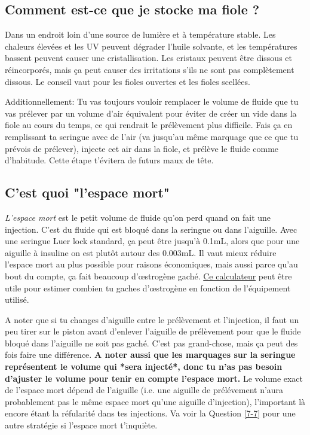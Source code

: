 \documentclass{article}
\begin{document}
\subsection{Comment est-ce que je stocke ma fiole ?}\label{5-25}

Dans un endroit loin d'une source de lumière et à température stable. Les chaleurs élevées et les UV peuvent dégrader l'huile solvante, et les températures bassent peuvent causer une cristallisation. Les cristaux peuvent être dissous et réincorporés, mais ça peut causer des irritations s'ils ne sont pas complètement dissous. Le conseil vaut pour les fioles ouvertes et les fioles scellées.

Additionnellement: Tu vas toujours vouloir remplacer le volume de fluide que tu vas prélever par un volume d'air équivalent pour éviter de créer un vide dans la fiole au cours du temps, ce qui rendrait le prélèvement plus difficile. Fais ça en remplissant ta seringue avec de l'air (va jusqu'au même marquage que ce que tu prévois de prélever), injecte cet air dans la fiole, et prélève le fluide comme d'habitude. Cette étape t'évitera de futurs maux de tête.

\subsection{C'est quoi "l'espace mort"}\label{5-26}

\textit{L'espace mort} est le petit volume de fluide qu'on perd quand on fait une injection. C'est du fluide qui est bloqué dans la seringue ou dans l'aiguille. Avec une seringue Luer lock standard, ça peut être jusqu'à 0.1mL, alors que pour une aiguille à insuline on est plutôt autour des 0.003mL. Il vaut mieux réduire l'espace mort au plus possible pour raisons économiques, mais aussi parce qu'au bout du compte, ça fait beaucoup d'œstrogène gaché. \href{https://web.archive.org/web/20260307075103/https://hrtcafe.net/Calc/}{Ce calculateur} peut être utile pour estimer combien tu gaches d'œstrogène en fonction de l'équipement utilisé.

A noter que si tu changes d'aiguille entre le prélèvement et l'injection, il faut un peu tirer sur le piston avant d'enlever l'aiguille de prélèvement pour que le fluide bloqué dans l'aiguille ne soit pas gaché. C'est pas grand-chose, mais ça peut des fois faire une différence. \textbf{A noter aussi que les marquages sur la seringue représentent le volume qui *sera injecté*, donc tu n'as pas besoin d'ajuster le volume pour tenir en compte l'espace mort.} Le volume exact de l'espace mort dépend de l'aiguille (i.e. une aiguille de prélévement n'aura probablement pas le même espace mort qu'une aiguille d'injection), l'important là encore étant la réfularité dans tes injections. Va voir la Question \ref{7-7} pour une autre stratégie si l'espace mort t'inquiète.
\end{document}
